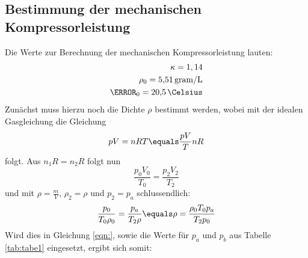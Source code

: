 \subsection{Bestimmung der mechanischen Kompressorleistung}
Die Werte zur Berechnung der mechanischen Kompressorleistung lauten:
\begin{align*}
  \kappa = 1,14 \\
  \rho_0 = \SI{5.51}{gram\per\liter} \\
  \T_0 = \SI{20.5}{\Celsius}
\end{align*}
Zunächst muss hierzu noch die Dichte $\rho$ bestimmt werden, wobei mit der idealen Gasgleichung
die Gleichung
\begin{equation}
  pV =nRT \equals \frac{pV}{T}{nR}
\end{equation}
folgt. Aus $n_1R =n_2R$ folgt nun
\begin{equation}
  \frac{p_0 V_0}{T_0} = \frac{p_2 V_2}{T_2}
\end{equation}
und mit $\rho = \frac{m}{V}$, $\rho_2=\rho$ und $p_2 =p_a$ schlussendlich:
\begin{equation}
  \frac{p_0}{T_0\rho_0} = \frac{p_a}{T_2 \rho} \equals \rho = \frac{\rho_0 T_0 p_a}{T_2p_0}
\end{equation}
Wird dies in Gleichung \ref{eqn:}, sowie die Werte für $p_a$ und $p_b$ aus Tabelle
\ref{tab:tabe1} eingesetzt, ergibt sich somit:

